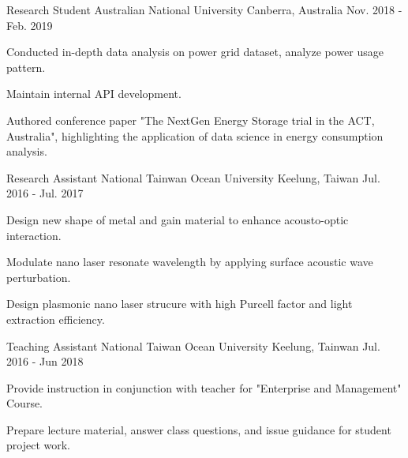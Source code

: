 \begin{cventries}
  \cventry
    {Research Student} %
    {Australian National University} %
    {Canberra, Australia} %
    {Nov. 2018 - Feb. 2019} %
    {
      \begin{cvitems}
        \item {Conducted in-depth data analysis on power grid dataset, analyze power usage pattern.}
        \item {Maintain internal API development.}
        \item {Authored conference paper "The NextGen Energy Storage trial in the ACT, Australia", highlighting the application of data science in energy consumption analysis.}
      \end{cvitems}
    }

  \cventry
    {Research Assistant} %
    {National Tainwan Ocean University} %
    {Keelung, Taiwan} %
    {Jul. 2016 - Jul. 2017} %
    {
      \begin{cvitems} %
        \item {Design new shape of metal and gain material to enhance acousto-optic interaction.}
        \item {Modulate nano laser resonate wavelength by applying surface acoustic wave perturbation.}
        \item {Design plasmonic nano laser strucure with high Purcell factor and light extraction efficiency.}
      \end{cvitems}
    }

  \cventry
    {Teaching Assistant} %
    {National Taiwan Ocean University} %
    {Keelung, Tainwan} %
    {Jul. 2016 - Jun 2018} %
    {
      \begin{cvitems} %
        \item {Provide instruction in conjunction with teacher for "Enterprise and Management" Course.}
        \item {Prepare lecture material, answer class questions, and issue guidance for student project work.}
      \end{cvitems}
    }

\end{cventries}
